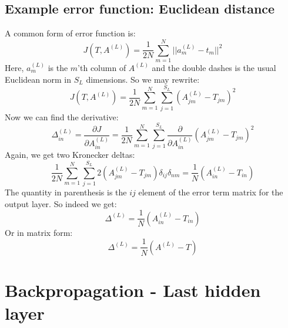 \documentclass[12pt, a4paper]{article}
\numberwithin{equation}{section}
\begin{document}
\subsection{Example error function: Euclidean distance}
A common form of error function is:
\begin{equation}
J(T,A^{(L)})=\frac{1}{2N}\sum_{m=1}^N||a^{(L)}_m-t_m||^2
\end{equation}
Here, $a^{(L)}_m$ is the $m$'th column of $A^{(L)}$ and the double dashes is the usual Euclidean norm in $S_L$ dimensions. So we may rewrite:
\begin{equation}
J(T,A^{(L)})=\frac{1}{2N}\sum_{m=1}^N\sum_{j=1}^{S_L}(A^{(L)}_{jm}-T_{jm})^2
\end{equation}
Now we can find the derivative:
\begin{equation}
\Delta^{(L)}_{in}=\frac{\partial J}{\partial A^{(L)}_{in}}=\frac{1}{2N}\sum_{m=1}^N\sum_{j=1}^{S_L}\frac{\partial}{\partial A^{(L)}_{in}}(A^{(L)}_{jm}-T_{jm})^2
\end{equation}
Again, we get two Kronecker deltas:
\begin{equation}
\frac{1}{2N}\sum_{m=1}^N\sum_{j=1}^{S_L}2(A^{(L)}_{jm}-T_{jm})\delta_{ij}\delta_{nm}=\frac{1}{N}(A^{(L)}_{in}-T_{in})
\end{equation}
The quantity in parenthesis is the $ij$ element of the error term matrix for the output layer. So indeed we get:
\begin{equation}
\Delta^{(L)}=\frac{1}{N}\left(A^{(L)}_{in}-T_{in}\right)
\end{equation}
Or in matrix form:
\begin{equation}
\Delta^{(L)}=\frac{1}{N}\left(A^{(L)}-T\right)
\end{equation}

\section{Backpropagation - Last hidden layer}
\end{document}
